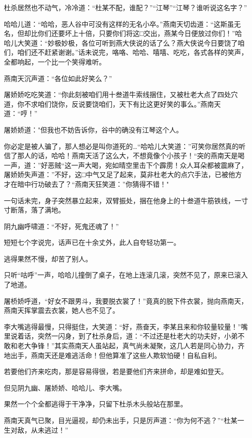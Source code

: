 \documentclass[12pt,oneside]{book}
\begin{document}
杜杀居然也不动气，冷冷道：``杜某不配，谁配？''``江琴''``江琴？谁听说这名字？''

哈哈儿道：``哈哈，恶人谷中可没有这样的无名小卒。''燕南天切齿道：``这斯虽无名，但却比你们还要坏上十倍，只要你们将这□交出，燕某今日便放过你们！''哈哈儿大笑道：``妙极妙极，各位可听到燕大侠说的话了么？燕大侠说今日要饶了咱们，咱们还不赶紧谢谢。''话未说完，咯咯、哈哈、嘻嘻、吃吃，各式各样的笑声，全都响起，一个比一个笑得难听。

燕南天沉声道：``各位如此好笑么？''

屠娇娇吃吃笑道：``你此刻被咱们用十叁道牛索线捆住，又被杜老大点了四处穴道，你不求咱们饶你，反说要饶咱们，天下有比这更好笑的事么。''燕南天道：``哼！''

屠娇娇道："但我也不妨告诉你，谷中的确没有江琴这个人。

你必定是被人骗了，那人想必是叫你道死的\ldots{}``哈哈儿大笑道：''可笑你居然真的听信了那人的话，哈哈！燕南天活了这么大，不想竟像个小孩子！``突的燕南天是喝一声，道：''好恶贼``这一声大喝，宛如晴空里击下个霹雳！众人耳朵都被震麻了，屠娇娇失声道：''不好，这□中气又足了起来，莫非杜老大的点穴手法，已被他方才在暗中行功破去了？``燕南天狂笑道：''你猜得不错！"

一句话未完，身子突然暴立起来，双臂振处，捆在他身上的十叁道牛筋铁线，一寸寸断落，落了满地。

阴九幽呼啸道：``不好，死鬼还魂了！''

短短七个字说完，话声已在十余丈外，此人自夸轻功第一。

逃得果然不慢，却苦了别人。

只听``咕呼''一声，哈哈儿撞倒了桌子，在地上连滚几滚，突然不见了，原来已滚入了地道。

屠桥娇呼道，``好女不跟男斗，我要脱衣裳了！''竟真的脱下件衣裳，抛向燕南天，燕南天挥掌震去衣裳，她人也不见了。

李大嘴逃得最慢，只得挺住，大笑道：``好，燕奋天，李某且来和你较量较量！''嘴里说着话，突然一闪身，到了杜杀身后，道：``不过还是杜老大的功夫好，小弟不敢和老大争锋！''其实燕南天人虽站起，真气尚未凝聚，这几人若是同心协力，齐地出手，燕南天还是难逃活命！但他算准了这些人欺软怕硬！自私自利。

若要他们齐来吃肉，那是容易得很，若是要他们齐来拼命，却是难如登天。

但见阴九幽、屠娇娇、哈哈儿、李大嘴。

果然一个个全都逃得于干净净，只留下杜杀木头般站在那里。

燕南天真气已聚，目光逼视，却仍未出手，只是厉声道：``你为何不逃？''``杜某一生对敌，从未逃过！''
\end{document}
